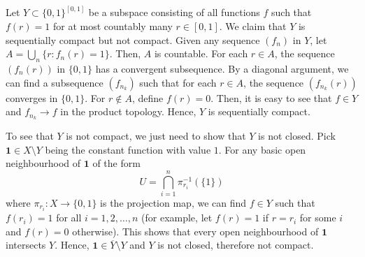 \begin{example}
Let $Y\subset \{0,1\}^{[0,1]}$ be a subspace consisting of all functions $f$ such that $f(r)=1$ for at most countably many $r\in [0,1]$. We claim that $Y$ is sequentially compact but not compact.
Given any sequence $(f_n)$ in $Y$, let $A=\bigcup_n\{r:f_n(r)=1\}$. Then, $A$ is countable. For each $r\in A$, the sequence $(f_n(r))$ in $\{0,1\}$ has a convergent subsequence. By a diagonal argument, we can find a subsequence $(f_{n_k})$ such that for each $r\in A$, the sequence $(f_{n_k}(r))$ converges in $\{0,1\}$. For $r\notin A$, define $f(r)=0$. Then, it is easy to see that $f\in Y$ and $f_{n_k}\to f$ in the product topology. Hence, $Y$ is sequentially compact.

To see that $Y$ is not compact, we just need to show that $Y$ is not closed. Pick $\mathbf{1}\in X\setminus Y$ being the constant function with value $1$. For any basic open neighbourhood of $\mathbf{1}$ of the form
\[U=\bigcap_{i=1}^n \pi_{r_i}^{-1}(\{1\})\]
where $\pi_{r_i}:X\to \{0,1\}$ is the projection map, we can find $f\in Y$ such that $f(r_i)=1$ for all $i=1,2,\ldots,n$ (for example, let $f(r)=1$ if $r=r_i$ for some $i$ and $f(r)=0$ otherwise). This shows that every open neighbourhood of $\mathbf{1}$ intersects $Y$. Hence, $\mathbf{1}\in \overline{Y}\setminus Y$ and $Y$ is not closed, therefore not compact.
\end{example}





